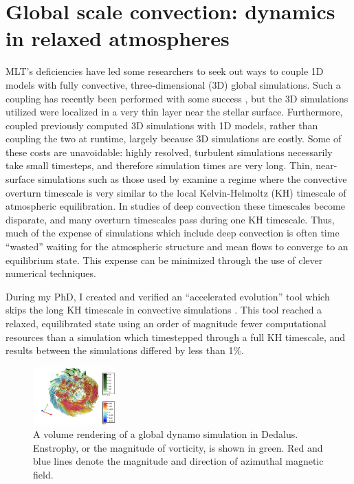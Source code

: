 \documentclass[preprint, hmargin=1in, vmargin=1in]{aastex62}
\begin{document}
\section{Global scale convection: dynamics in relaxed atmospheres}
MLT's deficiencies have led some researchers to seek out ways to couple 1D models with fully convective, three-dimensional (3D) global simulations.
Such a coupling has recently been performed with some success \citep{jorgensen&weiss2019}, but the 3D simulations utilized were localized in a very thin layer near the stellar surface.
Furthermore, \citet{jorgensen&weiss2019} coupled previously computed 3D simulations with 1D models, rather than coupling the two at runtime, largely because 3D simulations are costly.
Some of these costs are unavoidable: highly resolved, turbulent simulations necessarily take small timesteps, and therefore simulation times are very long.
Thin, near-surface simulations such as those used by \citet{jorgensen&weiss2019} examine a regime where the convective overturn timescale is very similar to the local Kelvin-Helmoltz (KH) timescale of atmospheric equilibration.
In studies of deep convection these timescales become disparate, and many overturn timescales pass during one KH timescale.
Thus, much of the expense of simulations which include deep convection is often time ``wasted'' waiting for the atmospheric structure and mean flows to converge to an equilibrium state.
This expense can be minimized through the use of clever numerical techniques.

During my PhD, I created and verified an ``accelerated evolution'' tool which skips the long KH timescale in convective simulations \citep{anders&all2018}.
This tool reached a relaxed, equilibrated state using an order of magnitude fewer computational resources than a simulation which timestepped through a full KH timescale, and results between the simulations differed by less than 1\%.

\begin{figure}
	\begin{center}
	\vspace{-10pt}
    \includegraphics[width=0.28\textwidth]{./figs/mdwarf.png}
	\vspace{-16pt}
	\end{center}
    \caption{A volume rendering of a global dynamo simulation in Dedalus.
	Enstrophy, or the magnitude of vorticity, is shown in green.
	Red and blue lines denote the magnitude and direction of azimuthal magnetic field.
	\label{fig:mdwarf} }
\end{figure}
\end{document}
